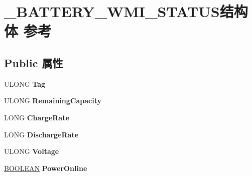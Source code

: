 \hypertarget{struct___b_a_t_t_e_r_y___w_m_i___s_t_a_t_u_s}{}\section{\+\_\+\+B\+A\+T\+T\+E\+R\+Y\+\_\+\+W\+M\+I\+\_\+\+S\+T\+A\+T\+U\+S结构体 参考}
\label{struct___b_a_t_t_e_r_y___w_m_i___s_t_a_t_u_s}
\subsection*{Public 属性}
\begin{DoxyCompactItemize}
\item 
\mbox{\label{struct___b_a_t_t_e_r_y___w_m_i___s_t_a_t_u_s_a5bf1ed52711c2b9a8ae0f8c7f0eab022}} 
U\+L\+O\+NG {\bfseries Tag}
\item 
\mbox{\label{struct___b_a_t_t_e_r_y___w_m_i___s_t_a_t_u_s_ae51af9b6b098969ccf54484eefa28f11}} 
U\+L\+O\+NG {\bfseries Remaining\+Capacity}
\item 
\mbox{\label{struct___b_a_t_t_e_r_y___w_m_i___s_t_a_t_u_s_ab1337efc0518314ecb9e933985b6431c}} 
L\+O\+NG {\bfseries Charge\+Rate}
\item 
\mbox{\label{struct___b_a_t_t_e_r_y___w_m_i___s_t_a_t_u_s_ab0b9acab59e46b512b07d53aba2aa7b9}} 
L\+O\+NG {\bfseries Discharge\+Rate}
\item 
\mbox{\label{struct___b_a_t_t_e_r_y___w_m_i___s_t_a_t_u_s_a49fb48ac4af240659af4a05c310d7a9d}} 
U\+L\+O\+NG {\bfseries Voltage}
\item 
\mbox{\label{struct___b_a_t_t_e_r_y___w_m_i___s_t_a_t_u_s_a4323dd71c93f38772f953b26719f4936}} 
\hyperlink{_processor_bind_8h_a112e3146cb38b6ee95e64d85842e380a}{B\+O\+O\+L\+E\+AN} {\bfseries Power\+Online}
\item 
\mbox{\label{struct___b_a_t_t_e_r_y___w_m_i___s_t_a_t_u_s_a354ecefe3d09a3fbbd78442d29e06391}} 

\end{DoxyCompactItemize}
